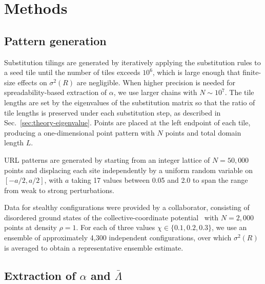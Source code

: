 \documentclass[11pt]{article}
\begin{document}
\section{Methods}
\label{sec:methods}

\subsection{Pattern generation}
\label{sec:methods-patterns}

Substitution tilings are generated by iteratively applying the substitution rules to a seed tile until the number of tiles exceeds $10^6$, which is large enough that finite-size effects on $\sigma^2(R)$ are negligible. When higher precision is needed for spreadability-based extraction of $\alpha$, we use larger chains with $N \sim 10^7$. The tile lengths are set by the eigenvalues of the substitution matrix so that the ratio of tile lengths is preserved under each substitution step, as described in Sec.~\ref{sec:theory-eigenvalue}. Points are placed at the left endpoint of each tile, producing a one-dimensional point pattern with $N$ points and total domain length $L$. 

URL patterns are generated by starting from an integer lattice of $N = 50{,}000$ points and displacing each site independently by a uniform random variable on $[-a/2, a/2]$, with $a$ taking 17 values between 0.05 and 2.0 to span the range from weak to strong perturbations.

Data for stealthy configurations were provided by a collaborator, consisting of disordered ground states of the collective-coordinate potential~\cite{torquato2015ensemble} with $N = 2{,}000$ points at density $\rho = 1$. For each of three values $\chi \in \{0.1, 0.2, 0.3\}$, we use an ensemble of approximately 4{,}300 independent configurations, over which $\sigma^2(R)$ is averaged to obtain a representative ensemble estimate.

\subsection{Extraction of $\alpha$ and $\bar\Lambda$}
\label{sec:methods-variance}
\label{sec:methods-alpha}
\end{document}
